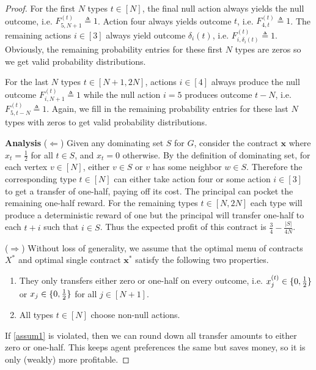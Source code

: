 \documentclass{article}
\DeclarePairedDelimiter{\set}{ \{ }{ \} }
\newcommand{\TypedForecast}[3]{F^{(#1)}_{#2, #3}}
\newcommand{\Contract}[1]{x_{#1}}
\newcommand{\TypedContract}[2]{x^{(#1)}_{#2}}
\newcommand{\ContractVector}{\bm{x}}
\newcommand{\ContractMatrix}{X}
\newcommand{\neighbor}[2]{\delta_{#1}\left(#2\right)}%
\begin{document}
\begin{proof}
 
For the first $N$ types $t \in [N]$, the final null action always yields the null outcome, i.e. $\TypedForecast{t}{5}{N+1} \triangleq 1$. Action four always yields outcome $t$, i.e. $\TypedForecast{t}{4}{t} \triangleq 1$. The remaining actions $i \in [3]$ always yield outcome $\neighbor{i}{t}$, i.e. $\TypedForecast{t}{i}{\neighbor{i}{t}} \triangleq 1$. Obviously, the remaining probability entries for these first $N$ types are zeros so we get valid probability distributions.

For the last $N$ types $t \in [N+1, 2N]$, actions $i \in [4]$ always produce the null outcome $\TypedForecast{t}{i}{N+1} \triangleq 1$ while the null action $i = 5$ produces outcome $t - N$, i.e. $\TypedForecast{t}{5}{t-N} \triangleq 1$. Again, we fill in the remaining probability entries for these last $N$ types with zeros to get valid probability distributions.

\textbf{Analysis}
($\Leftarrow$)  Given any dominating set $S$ for $G$, consider the contract $\ContractVector$ where $\Contract{t} = \frac12$ for all $t \in S$, and $\Contract{t} = 0$ otherwise. By the definition of dominating set, for each vertex $v \in [N]$, either $v \in S$ or $v$ has some neighbor $w \in S$. Therefore the corresponding type $t \in [N]$ can either take action four or some action $i \in [3]$ to get a transfer of one-half, paying off its cost. The principal can pocket the remaining one-half reward. For the remaining types $t \in [N, 2N]$ each type will produce a deterministic reward of one but the principal will transfer one-half to each $t + i$ such that $i \in S$. Thus the expected profit of this contract is $\frac34 - \frac{|S|}{4N}$. 

($\Rightarrow$) 
Without loss of generality, we assume that the optimal menu of contracts $\ContractMatrix^*$ and optimal single contract $\ContractVector^*$ satisfy the following two properties.
\begin{enumerate}
  \item \label{assum1} They only transfers either zero or one-half on every outcome, i.e. $\TypedContract{t}{j} \in \set{0, \frac12}$ or $\Contract{j} \in \set{0, \frac12}$ for all $j \in [N+1]$.  
  \item \label{assum2} All types $t \in [N]$ choose non-null actions.
\end{enumerate}

If \cref{assum1} is violated, then we can round down all transfer amounts to either zero or one-half. This keeps agent preferences the same but saves money, so it is only (weakly) more profitable.


\end{proof}
\end{document}

